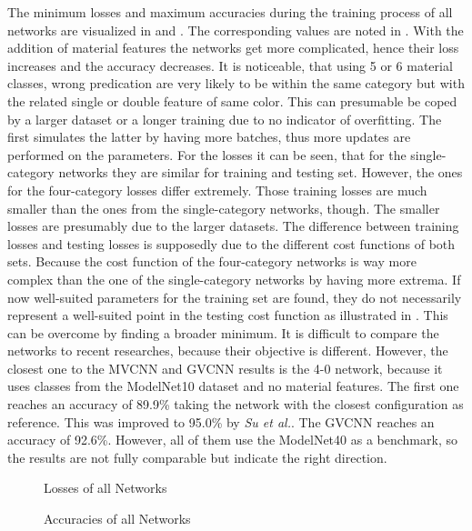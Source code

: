 The minimum losses and maximum accuracies during the training process of all networks are visualized in  and .
The corresponding values are noted in .
With the addition of material features the networks get more complicated, hence their loss increases and the accuracy decreases.
It is noticeable, that using 5 or 6 material classes, wrong predication are very likely to be within the same category but with the related single or double feature of same color.
This can presumable be coped by a larger dataset or a longer training due to no indicator of overfitting.
The first simulates the latter by having more batches, thus more updates are performed on the parameters.
For the losses it can be seen, that for the single-category networks they are similar for training and testing set.
However, the ones for the four-category losses differ extremely.
Those training losses are much smaller than the ones from the single-category networks, though.
The smaller losses are presumably due to the larger datasets.
The difference between training losses and testing losses is supposedly due to the different cost functions of both sets.
Because the cost function of the four-category networks is way more complex than the one of the single-category networks by having more extrema.
If now well-suited parameters for the training set are found, they do not necessarily represent a well-suited point in the testing cost function as illustrated in .
This can be overcome by finding a broader minimum.
It is difficult to compare the networks to recent researches, because their objective is different.
However, the closest one to the MVCNN and GVCNN results is the 4-0 network, because it uses classes from the ModelNet10 dataset and no material features.
The first one reaches an accuracy of 89.9\% taking the network with the closest configuration as reference.
This was improved to 95.0\% by \textit{Su et al.}.
The GVCNN reaches an accuracy of 92.6\%.
However, all of them use the ModelNet40 as a benchmark, so the results are not fully comparable but indicate the right direction.
\begin{figure}
	\setlength{}
	\setlength{}
	\centering
	
	\caption{Losses of all Networks}
	\label{fig:losses}
\end{figure}
\begin{figure}
	\setlength{}
	\setlength{}
	\centering
	
	\caption{Accuracies of all Networks}
	\label{fig:accuracies}
\end{figure}
